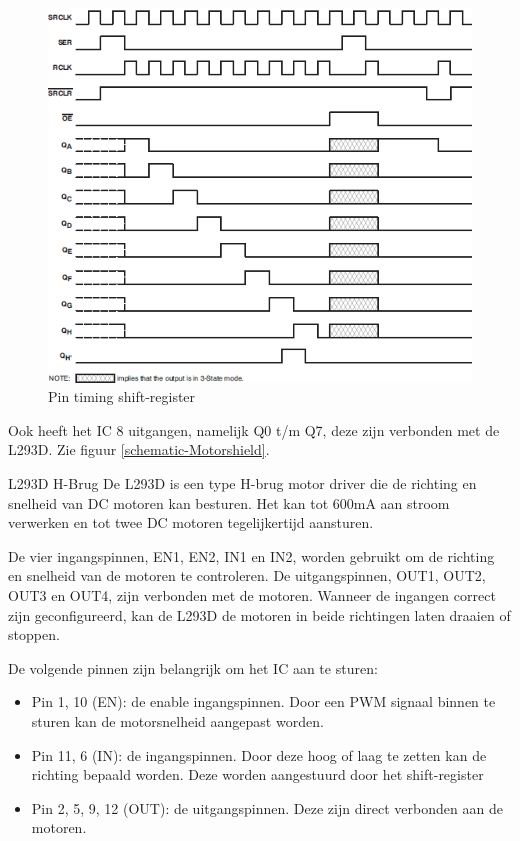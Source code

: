 \begin{figure} [h]
    \centering
    \includegraphics[scale = 0.7]{Media/Figuren/Timing.png}
    \caption{Pin timing \gls{shift-register}}
    \label{Timing-register}   
    \end{figure}
Ook heeft het IC 8 uitgangen, namelijk Q0 t/m Q7, deze zijn verbonden met de L293D. Zie figuur \ref{schematic-Motorshield}.


L293D H-Brug
De L293D\cite{h-brug} is een type H-brug motor driver die de richting en snelheid van DC motoren kan besturen. Het kan tot 600mA aan stroom verwerken en tot twee \gls{DC motoren} tegelijkertijd aansturen. 

De vier ingangspinnen, EN1, EN2, IN1 en IN2, worden gebruikt om de richting en snelheid van de motoren te controleren. 
De uitgangspinnen, OUT1, OUT2, OUT3 en OUT4, zijn verbonden met de motoren. Wanneer de ingangen correct zijn geconfigureerd, kan de L293D\cite{h-brug} de motoren in beide richtingen laten draaien of stoppen. 

De volgende pinnen zijn belangrijk om het IC aan te sturen:
\begin{itemize}
    \item Pin 1, 10 (EN): de enable ingangspinnen. Door een PWM signaal binnen te sturen kan de motorsnelheid aangepast worden.
    \item Pin 11, 6 (IN): de ingangspinnen. Door deze hoog of laag te zetten kan de richting bepaald worden. Deze worden aangestuurd door het \gls{shift-register}\cite{shiftregister}
    \item Pin 2, 5, 9, 12 (OUT): de uitgangspinnen. Deze zijn direct verbonden aan de motoren.
\end{itemize}

